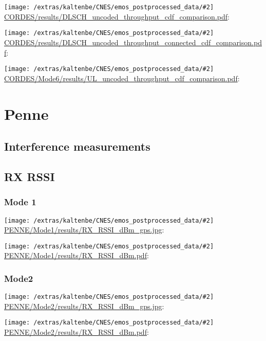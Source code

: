 \documentclass[a4paper,10pt]{article}
\newcommand{\printfile}[2][]{
 \begin{minipage}{8cm}
  \centering
  \texttt{[image: /extras/kaltenbe/CNES/emos\_postprocessed\_data/\#2]}
  \url{#2}: #1

 \end{minipage}
}
\begin{document}
\printfile{CORDES/results/DLSCH_uncoded_throughput_cdf_comparison.pdf}
\printfile{CORDES/results/DLSCH_uncoded_throughput_connected_cdf_comparison.pdf}

\printfile{CORDES/Mode6/results/UL_uncoded_throughput_cdf_comparison.pdf}

\section{Penne}
\label{sec:penne}

\subsection{Interference measurements}



\subsection{RX RSSI}


% 

\subsubsection{Mode 1}
\printfile{PENNE/Mode1/results/RX_RSSI_dBm_gps.jpg}
\printfile{PENNE/Mode1/results/RX_RSSI_dBm.pdf}


\subsubsection{Mode2}

\printfile{PENNE/Mode2/results/RX_RSSI_dBm_gps.jpg}
\printfile{PENNE/Mode2/results/RX_RSSI_dBm.pdf}

\end{document}
